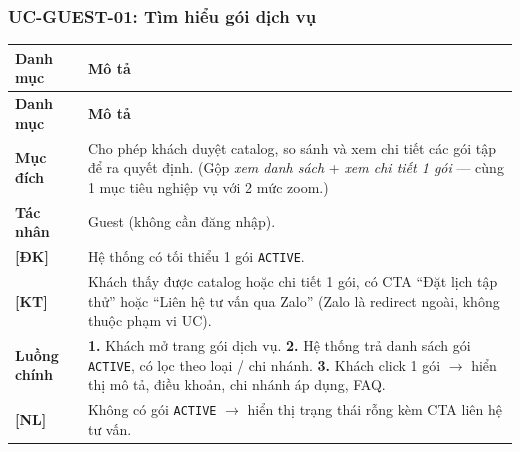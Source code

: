 \subsubsection{UC-GUEST-01: Tìm hiểu gói dịch vụ}
\begingroup
\renewcommand{\arraystretch}{1.3}
\begin{longtable}{|>{\centering\arraybackslash}m{3cm}|>{\raggedright\arraybackslash}m{12cm}|}
\hline
\textbf{Danh mục} & \textbf{Mô tả} \\ \hline
\endfirsthead
\hline
\textbf{Danh mục} & \textbf{Mô tả} \\ \hline
\endhead
\hline
\endfoot
\textbf{Mục đích} & Cho phép khách duyệt catalog, so sánh và xem chi tiết các gói tập để ra quyết định. (Gộp \emph{xem danh sách} + \emph{xem chi tiết 1 gói} — cùng 1 mục tiêu nghiệp vụ với 2 mức zoom.) \\
\hline
\textbf{Tác nhân} & Guest (không cần đăng nhập). \\
\hline
\textbf{[ĐK]} & Hệ thống có tối thiểu 1 gói \texttt{ACTIVE}. \\
\hline
\textbf{[KT]} & Khách thấy được catalog hoặc chi tiết 1 gói, có CTA ``Đặt lịch tập thử'' hoặc ``Liên hệ tư vấn qua Zalo'' (Zalo là redirect ngoài, không thuộc phạm vi UC). \\
\hline
\textbf{Luồng chính} & \textbf{1.} Khách mở trang gói dịch vụ. \textbf{2.} Hệ thống trả danh sách gói \texttt{ACTIVE}, có lọc theo loại / chi nhánh. \textbf{3.} Khách click 1 gói $\rightarrow$ hiển thị mô tả, điều khoản, chi nhánh áp dụng, FAQ. \\
\hline
\textbf{[NL]} & Không có gói \texttt{ACTIVE} $\rightarrow$ hiển thị trạng thái rỗng kèm CTA liên hệ tư vấn. \\
\hline
\end{longtable}
\endgroup


